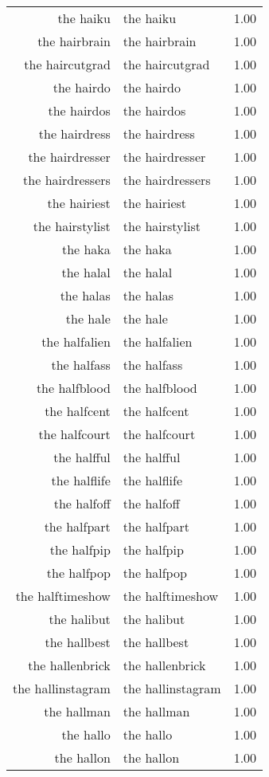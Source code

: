 \begin{table}[ht]
\begin{tabular}{rlr}
  the haiku & the haiku & 1.00 \\ 
  the hairbrain & the hairbrain & 1.00 \\ 
  the haircutgrad & the haircutgrad & 1.00 \\ 
  the hairdo & the hairdo & 1.00 \\ 
  the hairdos & the hairdos & 1.00 \\ 
  the hairdress & the hairdress & 1.00 \\ 
  the hairdresser & the hairdresser & 1.00 \\ 
  the hairdressers & the hairdressers & 1.00 \\ 
  the hairiest & the hairiest & 1.00 \\ 
  the hairstylist & the hairstylist & 1.00 \\ 
  the haka & the haka & 1.00 \\ 
  the halal & the halal & 1.00 \\ 
  the halas & the halas & 1.00 \\ 
  the hale & the hale & 1.00 \\ 
  the halfalien & the halfalien & 1.00 \\ 
  the halfass & the halfass & 1.00 \\ 
  the halfblood & the halfblood & 1.00 \\ 
  the halfcent & the halfcent & 1.00 \\ 
  the halfcourt & the halfcourt & 1.00 \\ 
  the halfful & the halfful & 1.00 \\ 
  the halflife & the halflife & 1.00 \\ 
  the halfoff & the halfoff & 1.00 \\ 
  the halfpart & the halfpart & 1.00 \\ 
  the halfpip & the halfpip & 1.00 \\ 
  the halfpop & the halfpop & 1.00 \\ 
  the halftimeshow & the halftimeshow & 1.00 \\ 
  the halibut & the halibut & 1.00 \\ 
  the hallbest & the hallbest & 1.00 \\ 
  the hallenbrick & the hallenbrick & 1.00 \\ 
  the hallinstagram & the hallinstagram & 1.00 \\ 
  the hallman & the hallman & 1.00 \\ 
  the hallo & the hallo & 1.00 \\ 
  the hallon & the hallon & 1.00 \\ 

\end{tabular}
\end{table}
